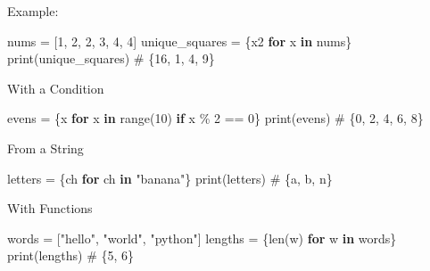 \documentclass[
  letterpaper,
  DIV=11,
  numbers=noendperiod]{scrreprt}
\newenvironment{Shaded}{\begin{snugshade}}{\end{snugshade}}
\newcommand{\BuiltInTok}[1]{\textcolor[rgb]{0.00,0.23,0.31}{#1}}
\newcommand{\CommentTok}[1]{\textcolor[rgb]{0.37,0.37,0.37}{#1}}
\newcommand{\ControlFlowTok}[1]{\textcolor[rgb]{0.00,0.23,0.31}{\textbf{#1}}}
\newcommand{\DecValTok}[1]{\textcolor[rgb]{0.68,0.00,0.00}{#1}}
\newcommand{\KeywordTok}[1]{\textcolor[rgb]{0.00,0.23,0.31}{\textbf{#1}}}
\newcommand{\NormalTok}[1]{\textcolor[rgb]{0.00,0.23,0.31}{#1}}
\newcommand{\OperatorTok}[1]{\textcolor[rgb]{0.37,0.37,0.37}{#1}}
\newcommand{\StringTok}[1]{\textcolor[rgb]{0.13,0.47,0.30}{#1}}
\begin{document}
Example:

\begin{Shaded}
\begin{Highlighting}[]
\NormalTok{nums }\OperatorTok{=}\NormalTok{ [}\DecValTok{1}\NormalTok{, }\DecValTok{2}\NormalTok{, }\DecValTok{2}\NormalTok{, }\DecValTok{3}\NormalTok{, }\DecValTok{4}\NormalTok{, }\DecValTok{4}\NormalTok{]}
\NormalTok{unique\_squares }\OperatorTok{=}\NormalTok{ \{x2 }\ControlFlowTok{for}\NormalTok{ x }\KeywordTok{in}\NormalTok{ nums\}}
\BuiltInTok{print}\NormalTok{(unique\_squares)   }\CommentTok{\# \{16, 1, 4, 9\}}
\end{Highlighting}
\end{Shaded}

With a Condition

\begin{Shaded}
\begin{Highlighting}[]
\NormalTok{evens }\OperatorTok{=}\NormalTok{ \{x }\ControlFlowTok{for}\NormalTok{ x }\KeywordTok{in} \BuiltInTok{range}\NormalTok{(}\DecValTok{10}\NormalTok{) }\ControlFlowTok{if}\NormalTok{ x }\OperatorTok{\%} \DecValTok{2} \OperatorTok{==} \DecValTok{0}\NormalTok{\}}
\BuiltInTok{print}\NormalTok{(evens)   }\CommentTok{\# \{0, 2, 4, 6, 8\}}
\end{Highlighting}
\end{Shaded}

From a String

\begin{Shaded}
\begin{Highlighting}[]
\NormalTok{letters }\OperatorTok{=}\NormalTok{ \{ch }\ControlFlowTok{for}\NormalTok{ ch }\KeywordTok{in} \StringTok{"banana"}\NormalTok{\}}
\BuiltInTok{print}\NormalTok{(letters)   }\CommentTok{\# \{\textquotesingle{}a\textquotesingle{}, \textquotesingle{}b\textquotesingle{}, \textquotesingle{}n\textquotesingle{}\}}
\end{Highlighting}
\end{Shaded}

With Functions

\begin{Shaded}
\begin{Highlighting}[]
\NormalTok{words }\OperatorTok{=}\NormalTok{ [}\StringTok{"hello"}\NormalTok{, }\StringTok{"world"}\NormalTok{, }\StringTok{"python"}\NormalTok{]}
\NormalTok{lengths }\OperatorTok{=}\NormalTok{ \{}\BuiltInTok{len}\NormalTok{(w) }\ControlFlowTok{for}\NormalTok{ w }\KeywordTok{in}\NormalTok{ words\}}
\BuiltInTok{print}\NormalTok{(lengths)   }\CommentTok{\# \{5, 6\}}
\end{Highlighting}
\end{Shaded}
\end{document}
